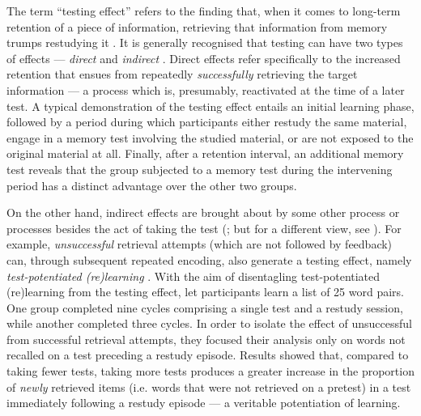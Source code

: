 \documentclass[../main.tex]{subfiles}
\begin{document}
The term ``testing effect'' refers to the finding that, when it comes to long-term retention of a piece of information, retrieving that information from memory trumps restudying it \citep{karpickeCriticalImportanceRetrieval2008,roedigeriiiPowerTestingMemory2006, roedigeriiiTestEnhancedLearningTaking2006, rowlandEffectTestingRestudy2014, adesopeRethinkingUseTests2017, roedigeriiiCriticalRoleRetrieval2011, gloverTestingPhenomenonNot1989}. It is generally recognised that testing can have two types of effects --- \textit{direct} and \textit{indirect} \citep{arnoldTestpotentiatedLearningDistinguishing2013, roedigeriiiPowerTestingMemory2006}. Direct effects refer specifically to the increased retention that ensues from repeatedly \textit{successfully} retrieving the target information --- a process which is, presumably, reactivated at the time of a later test. A typical demonstration of the testing effect entails an initial learning phase, followed by a period during which participants either restudy the same material, engage in a memory test involving the studied material, or are not exposed to the original material at all. Finally, after a retention interval, an additional memory test reveals that the group subjected to a memory test during the intervening period has a distinct advantage over the other two groups. 

On the other hand, indirect effects are brought about by some other process or processes besides the act of taking the test (\citealp{roedigeriiiPowerTestingMemory2006}; but for a different view, see \citealp{kornellRetrievalAttemptsEnhance2015}). For example, \textit{unsuccessful} retrieval attempts (which are not followed by feedback) can, through subsequent repeated encoding, also generate a testing effect, namely \textit{test-potentiated (re)learning} \citep{izawaReinforcementTestSequencesPairedAssociate1966,izawaOptimalPotentiatingEffects1970, kornellUnsuccessfulRetrievalAttempts2009, arnoldFreeRecallEnhances2013, arnoldTestpotentiatedLearningDistinguishing2013, wissmanTestpotentiatedLearningThree2018}. With the aim of disentagling test-potentiated (re)learning from the testing effect, \cite{arnoldTestpotentiatedLearningDistinguishing2013} let participants learn a list of 25 word pairs. One group completed nine cycles comprising a single test and a restudy session, while another completed three cycles. In order to isolate the effect of unsuccessful from successful retrieval attempts, they focused their analysis only on words not recalled on a test preceding a restudy episode. Results showed that, compared to taking fewer tests, taking more tests produces a greater increase in the proportion of \textit{newly} retrieved items (i.e. words that were not retrieved on a pretest) in a test immediately following a restudy episode --- a veritable potentiation of learning.
\end{document}
